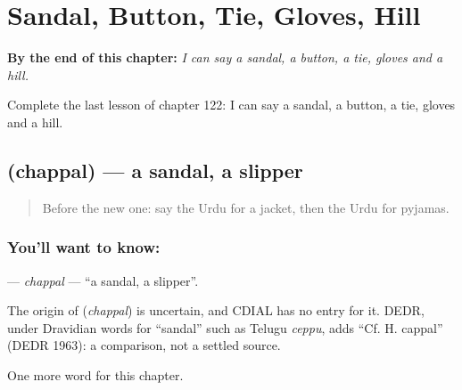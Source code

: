 
\chapter{Sandal, Button, Tie, Gloves, Hill}
\label{ch:ur-sandal-button-tie-gloves-hill}

\begin{chapteropening}
\textbf{By the end of this chapter:} \emph{I can say a sandal, a button, a tie, gloves and a hill.}

Complete the last lesson of chapter 122: I can say a sandal, a button, a tie, gloves and a hill.
\end{chapteropening}

\section[\texorpdfstring{\ur{چپل} (chappal)}{چپل (chappal)}]{ (chappal) — a sandal, a slipper}

\label{lesson:UR-C122-chappal}



\begin{quote}
Before the new one: say the Urdu for a jacket, then the Urdu for pyjamas.
\end{quote}

\subsection*{You'll want to know: }
\textbf{} — \emph{chappal} — \textquotedblleft{}a sandal, a slipper\textquotedblright{}.

\begin{cousinweb}
The origin of \textbf{} (\emph{chappal}) is uncertain, and CDIAL has no entry for it. DEDR, under Dravidian words for \textquotedblleft{}sandal\textquotedblright{} such as Telugu \emph{ceppu}, adds \textquotedblleft{}Cf. H. cappal\textquotedblright{} (DEDR 1963): a comparison, not a settled source.
\end{cousinweb}

\begin{grammarlens}[title={What you've built}]
One more word for this chapter.
\end{grammarlens}

